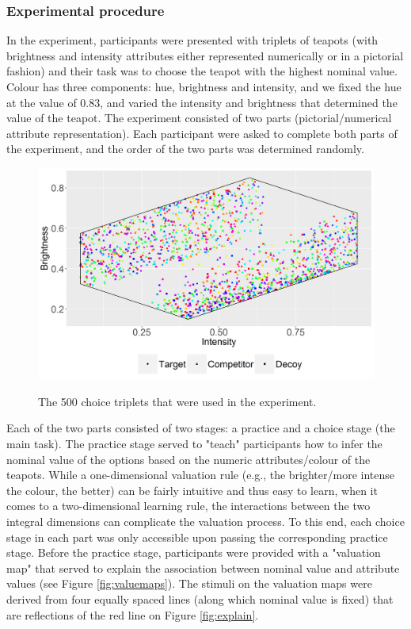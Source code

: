 \documentclass[11pt,a4paper]{article}
\begin{document}
\subsubsection{Experimental procedure}

In the experiment, participants were presented with triplets of teapots (with brightness and intensity attributes either represented numerically or in a pictorial fashion) and their task was to choose the teapot with the highest nominal value. Colour has three components: hue, brightness and intensity, and we fixed the hue at the value of 0.83, and varied the 
intensity and brightness that determined the value of the teapot. The experiment consisted of two parts (pictorial/numerical attribute representation). Each participant were asked to complete both parts of the experiment, and the order of the two parts was determined randomly. 


\begin{figure}
\centering
\caption{The 500 choice triplets that were used in the experiment.}
\includegraphics[width=1\textwidth]{Figure_2poly.png}
\label{fig:choice_sets}
\end{figure}

Each of the two parts consisted of two stages: a practice and a choice stage (the main task). The practice stage served to "teach" participants how to infer the nominal value of the options based on the numeric attributes/colour of the teapots. While a one-dimensional valuation rule (e.g., the brighter/more intense the colour, the better) can be fairly intuitive and thus easy to learn, when it comes to a two-dimensional learning rule, the interactions between the two integral dimensions can complicate the valuation process. To this end, each choice stage in each part was only accessible upon passing the corresponding practice stage. Before the practice stage, participants  were provided with a "valuation map" that served to explain the association between nominal value and attribute values (see Figure \ref{fig:valuemaps}). The stimuli on the valuation maps were derived from four equally spaced lines (along which nominal value is fixed) that are reflections of the red line on Figure \ref{fig:explain}.
\end{document}

